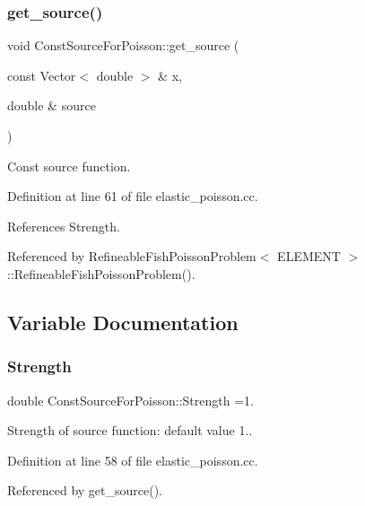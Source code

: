 \subsubsection{\texorpdfstring{get\+\_\+source()}{get\_source()}}
{\footnotesize\ttfamily void Const\+Source\+For\+Poisson\+::get\+\_\+source (\begin{DoxyParamCaption}\item[{const Vector$<$ double $>$ \&}]{x,  }\item[{double \&}]{source }\end{DoxyParamCaption})}



Const source function. 



Definition at line 61 of file elastic\+\_\+poisson.\+cc.



References Strength.



Referenced by Refineable\+Fish\+Poisson\+Problem$<$ E\+L\+E\+M\+E\+N\+T $>$\+::\+Refineable\+Fish\+Poisson\+Problem().



\subsection{Variable Documentation}
\mbox{\label{namespaceConstSourceForPoisson_add351c5acab2561d68d1fc9ec3d5fc5e}} 
\subsubsection{\texorpdfstring{Strength}{Strength}}
{\footnotesize\ttfamily double Const\+Source\+For\+Poisson\+::\+Strength =1.}



Strength of source function\+: default value 1.. 



Definition at line 58 of file elastic\+\_\+poisson.\+cc.



Referenced by get\+\_\+source().

